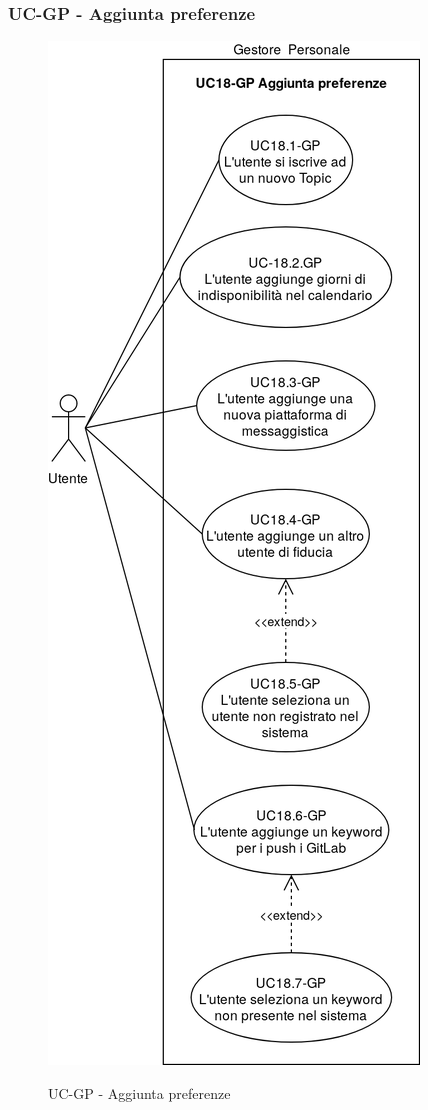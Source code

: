 \subsubsection{UC\theuccount-GP - Aggiunta preferenze}
		\begin{figure}[H]
			\centering
				\includegraphics[width=\columnwidth]{img/casi_d'uso/UC18.png}\\
			\caption{UC\theuccount-GP - Aggiunta preferenze}
		\end{figure}
